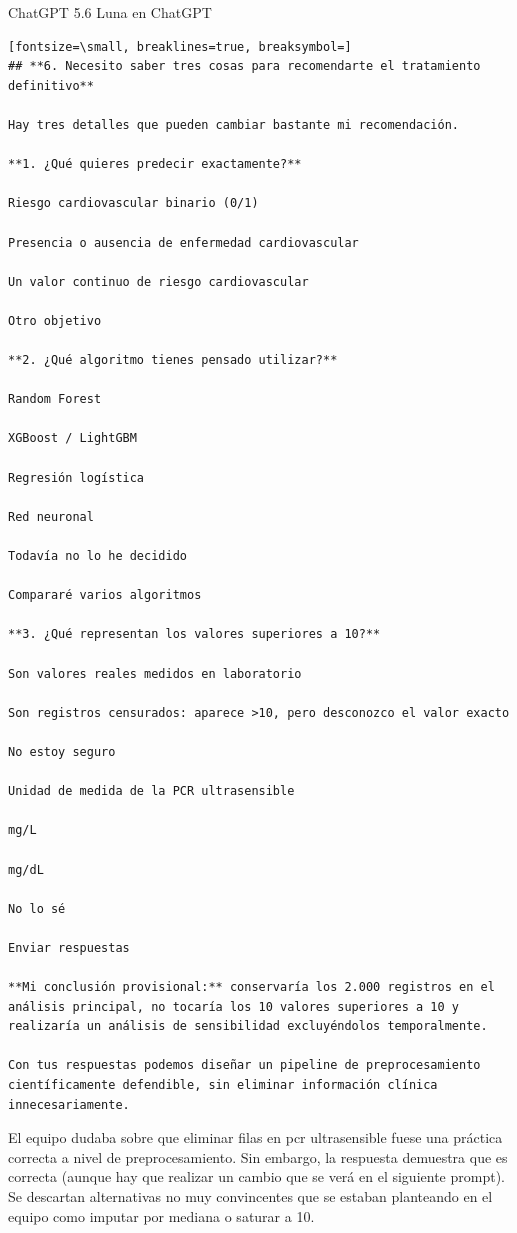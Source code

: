 \documentclass[12pt,a4paper,oneside]{book}
\begin{document}
\begin{iaresp}{ChatGPT 5.6 Luna en ChatGPT}
\begin{Verbatim}[fontsize=\small, breaklines=true, breaksymbol=]
## **6. Necesito saber tres cosas para recomendarte el tratamiento definitivo**

Hay tres detalles que pueden cambiar bastante mi recomendación.

**1. ¿Qué quieres predecir exactamente?**

Riesgo cardiovascular binario (0/1)

Presencia o ausencia de enfermedad cardiovascular

Un valor continuo de riesgo cardiovascular

Otro objetivo

**2. ¿Qué algoritmo tienes pensado utilizar?**

Random Forest

XGBoost / LightGBM

Regresión logística

Red neuronal

Todavía no lo he decidido

Compararé varios algoritmos

**3. ¿Qué representan los valores superiores a 10?**

Son valores reales medidos en laboratorio

Son registros censurados: aparece >10, pero desconozco el valor exacto

No estoy seguro

Unidad de medida de la PCR ultrasensible

mg/L

mg/dL

No lo sé

Enviar respuestas

**Mi conclusión provisional:** conservaría los 2.000 registros en el análisis principal, no tocaría los 10 valores superiores a 10 y realizaría un análisis de sensibilidad excluyéndolos temporalmente.

Con tus respuestas podemos diseñar un pipeline de preprocesamiento científicamente defendible, sin eliminar información clínica innecesariamente.
\end{Verbatim}
\end{iaresp}
\begin{iaanalisis}
El equipo dudaba sobre que eliminar filas  en pcr ultrasensible fuese una práctica correcta a nivel de preprocesamiento. Sin embargo, la respuesta demuestra que es correcta (aunque hay que realizar un cambio que se verá en el siguiente prompt). Se descartan alternativas no muy convincentes que se estaban planteando en el equipo como imputar por mediana o saturar a 10.
\end{iaanalisis}
\end{document}
